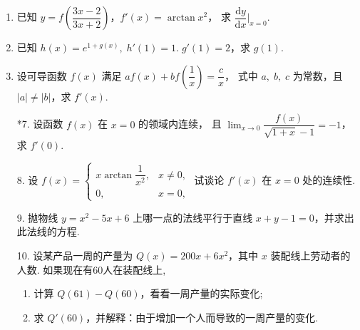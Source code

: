 \begin{enumerate}
    \item 已知 $y=f\left(\dfrac{3x-2}{3x+2}\right)$，$f'(x)=\arctan x^2$，
    求 $\dfrac{\text{d}y}{\text{d}x}\bigg|_{x=0}$.
    
    \item 已知 $h(x)=e^{1+g(x)},\;h'(1)=1.\;g'(1)=2$，求 $g(1)$.
    
    \item 设可导函数 $f(x)$ 满足 $af(x)+bf\left(\dfrac{1}{x}\right)=\dfrac{c}{x}$，
    式中 $a,\;b,\;c$ 为常数，且 $|a|\not=|b|$，求 $f'(x)$.

    \item[*7.] 设函数 $f(x)$ 在 $x=0$ 的领域内连续，
    且 $\displaystyle\lim_{x\to0}\dfrac{f(x)}{\sqrt{1+x}-1}=-1$，求 $f'(0)$. 

    \item[8.] 设 $f(x)=\begin{cases}
        x\arctan\dfrac{1}{x^2},&x\not=0,\\
        0,&x=0,
    \end{cases}$ 试谈论 $f'(x)$ 在 $x=0$ 处的连续性.

    \item[9.] 抛物线 $y=x^2-5x+6$ 上哪一点的法线平行于直线 $x+y-1=0$，并求出此法线的方程.
    
    \item[10.] 设某产品一周的产量为 $Q(x)=200x+6x^2$，其中 $x$ 装配线上劳动者的人数. 如果现在有60人在装配线上,
    \begin{enumerate}[(1)]\setlength{\itemsep}{5pt}\setlength{\topsep}{15pt}
        \item 计算 $Q(61)-Q(60)$，看看一周产量的实际变化;
        \item 求 $Q'(60)$，并解释：由于增加一个人而导致的一周产量的变化.
    \end{enumerate}

\end{enumerate}

